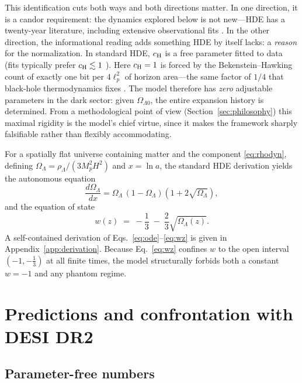 \documentclass[11pt,a4paper]{article}
\begin{document}
This identification cuts both ways and both directions matter. In one
direction, it is a candor requirement: the dynamics explored below is not
new---HDE has a twenty-year literature, including extensive observational
fits \citep{Li2004,HuangLi2004,WangReview2017}. In the other direction, the
informational reading adds something HDE by itself lacks: a \emph{reason} for
the normalization. In standard HDE, $c_{\rm H}$ is a free parameter fitted
to data (fits typically prefer $c_{\rm H}\lesssim 1$
\citep{HuangLi2004,WangReview2017}). Here $c_{\rm H}=1$ is forced by the
Bekenstein--Hawking count of exactly one bit per $4\ell_p^2$ of horizon
area---the same factor of $1/4$ that black-hole thermodynamics fixes
\citep{Bekenstein1973,Hawking1975}. The model therefore has \emph{zero}
adjustable parameters in the dark sector: given $\Omega_{\Lambda 0}$, the
entire expansion history is determined. From a methodological point of view
(Section~\ref{sec:philosophy}) this maximal rigidity is the model's chief
virtue, since it makes the framework sharply falsifiable rather than
flexibly accommodating.

For a spatially flat universe containing matter and the component
\eqref{eq:rhodyn}, defining $\Omega_\Lambda = \rho_\Lambda/(3M_p^2H^2)$ and
$x=\ln a$, the standard HDE derivation \citep{Li2004} yields the autonomous
equation
\begin{equation}
\frac{d\Omega_\Lambda}{dx}
= \Omega_\Lambda\,(1-\Omega_\Lambda)\left(1 + 2\sqrt{\Omega_\Lambda}\right),
\label{eq:ode}
\end{equation}
and the equation of state
\begin{equation}
w(z) \;=\; -\frac13 \;-\; \frac{2}{3}\sqrt{\Omega_\Lambda(z)} .
\label{eq:wz}
\end{equation}
A self-contained derivation of Eqs.~\eqref{eq:ode}--\eqref{eq:wz} is given in
Appendix~\ref{app:derivation}. Because Eq.~\eqref{eq:wz} confines $w$ to the
open interval $(-1,-\tfrac13)$ at all finite times, the model structurally
forbids both a constant $w=-1$ and any phantom regime.

\section{Predictions and confrontation with DESI DR2}
\label{sec:pred}

\subsection{Parameter-free numbers}
\end{document}
